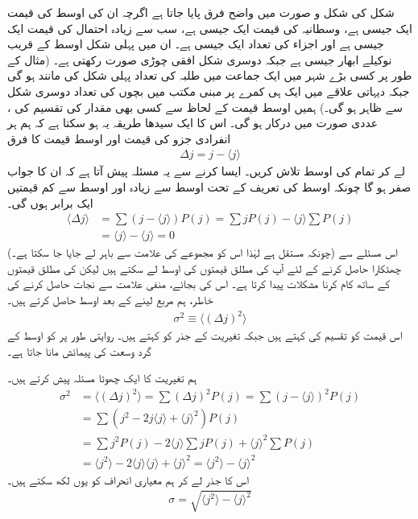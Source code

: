 شکل  کی شکل و صورت  میں واضح فرق پایا جاتا ہے اگرچہ ان کی اوسط کی قیمت ایک جیسی ہے، وسطانیہ کی قیمت  ایک جیسی ہے،  سب سے زیادہ  احتمال کی    قیمت ایک جیسی ہے   اور اجزاء کی تعداد ایک جیسی ہے۔ ان میں پہلی شکل اوسط کے قریب نوکیلے   ابھار جیسی  ہے جبکہ دوسری شکل  افقی چوڑی  صورت رکھتی ہے۔ (مثال کے طور پر کسی بڑے شہر میں ایک جماعت میں طلبہ  کی تعداد پہلی شکل کی   مانند ہو گی جبکہ دیہاتی علاقے    میں ایک ہی کمرے  پر مبنی مکتب  میں بچوں کی تعداد دوسری شکل سے  ظاہر ہو گی۔) ہمیں اوسط قیمت کے لحاظ سے کسی بھی مقدار کی تقسیم کی ، عددی صورت میں درکار ہو گی۔ اس کا ایک سیدھا طریقہ یہ ہو سکتا ہے کہ ہم ہر انفرادی جزو کی قیمت اور اوسط قیمت کا فرق
\begin{align}
\Delta j = j-\langle j \rangle 
\end{align}
لے کر  تمام  کی اوسط تلاش کریں۔ ایسا کرنے سے یہ مسئلہ پیش آتا ہے کہ ان کا جواب صفر ہو گا چونکہ اوسط کی تعریف کے تحت اوسط سے زیادہ اور اوسط سے کم قیمتیں ایک برابر ہوں گی۔ 
\begin{align*}
\langle \Delta j \rangle &= \sum \left( j -  \langle j \rangle  \right) P(j) = \sum jP(j) - \langle j \rangle \sum P(j) \\
 &= \langle j \rangle - \langle j \rangle = 0
\end{align*}
(چونکہ    مستقل ہے لہٰذا اس کو مجموعے  کی علامت سے باہر لے جایا جا سکتا ہے۔) اس مسئلے سے چھٹکارا حاصل کرنے کے لئے   آپ      کی مطلق قیمتوں کی  اوسط لے سکتے ہیں لیکن     کی مطلق قیمتوں  کے ساتھ کام کرنا مشکلات پیدا کرتا ہے۔ اس کی بجائے، منفی علامت سے نجات حاصل کرنے کی خاطر، ہم مربع لینے کے بعد اوسط حاصل کرتے ہیں۔
\begin{align} \label{مساوات_تفاعل_موج_تعریف_معیاری_احتمال_الف}
 \sigma^{2} \equiv \langle \left( \Delta j \right)^{2} \rangle 
\end{align}
اس قیمت کو تقسیم کی  کہتے ہیں جبکہ تغیریت کے جذر   کو  کہتے ہیں۔ روایتی طور پر   کو اوسط   کے گرد  وسعت  کی پیمائش  مانا جاتا ہے۔

 ہم تغیریت کا ایک چھوٹا مسئلہ پیش کرتے ہیں۔ 
\begin{align*}
\sigma^{2} &= \langle ( \Delta j )^{2} \rangle = \sum ( \Delta j )^{2} P(j) = \sum (j- \langle j \rangle )^{2} P(j) \\
&= \sum (j^{2} -2j \langle j \rangle + \langle j \rangle ^{2} ) P(j) \\ 
&= \sum j^{2} P(j) -2 \langle j \rangle \sum jP(j) + \langle j \rangle ^{2} \sum P(j) \\ 
&= \langle j^{2}\rangle -2\langle j \rangle \langle j \rangle + \langle j \rangle ^{2} = \langle j^{2} \rangle - \langle j \rangle ^{2}
\end{align*}
اس کا جذر لے کر ہم معیاری انحراف کو    یوں  لکھ سکتے ہیں۔ 
\begin{align}\label{مساوات_تفاعل_موج_تعریف_معیاری_احتمال_ب}
 \sigma = \sqrt{\langle j^{2} \rangle - \langle j \rangle ^{2}} 
\end{align}


